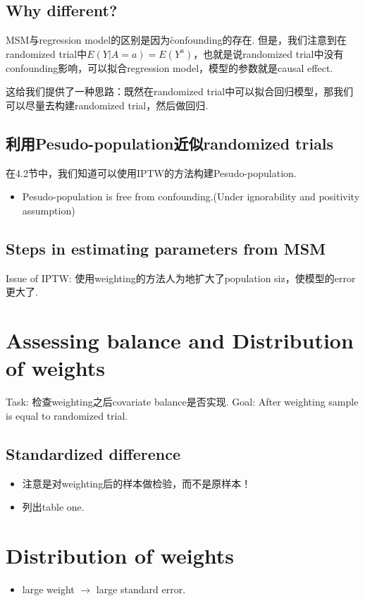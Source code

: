 \subsection{Why different?}
MSM与regression model的区别是因为\r{confounding的存在}. 但是，我们注意到在randomized trial中$E(Y|A=a)=E(Y^a)$，也就是说randomized trial中没有confounding影响，可以拟合regression model，模型的参数就是causal effect. 

这给我们提供了一种思路：既然在randomized trial中可以拟合回归模型，那我们可以尽量去构建randomized trial，然后做回归.

\subsection{利用Pesudo-population近似randomized trials}
在4.2节中，我们知道可以使用IPTW的方法构建Pesudo-population.

\begin{itemize}
	\item Pesudo-population is free from confounding.(Under ignorability and positivity assumption)
\end{itemize}

\subsection{Steps in estimating parameters from MSM}

Issue of IPTW: 使用weighting的方法人为地扩大了population siz，使模型的error更大了.

\section{Assessing balance and Distribution of weights}
Task: 检查weighting之后covariate balance是否实现.
Goal: After weighting sample is equal to randomized trial.
\subsection{Standardized difference}
\begin{itemize}
	\item 注意是对weighting后的样本做检验，而不是原样本！
	\item 列出table one.
\end{itemize} 

\section{Distribution of weights}
\begin{itemize}
	\item large weight $\longrightarrow$ large standard error.
\end{itemize}
